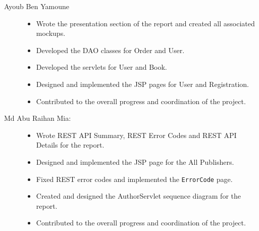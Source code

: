\begin{description}
	\item[Ayoub Ben Yamoune] 	    
	\begin{itemize}
		\item Wrote the presentation section of the report and created all associated mockups.
		\item Developed the DAO classes for Order and User.
		\item Developed the servlets for User and Book.
		\item Designed and implemented the JSP pages for User and Registration.
		\item Contributed to the overall progress and coordination of the project.
	\end{itemize}
	
	\item[Md Abu Raihan Mia:] \hfill
	\begin{itemize} 
	\item Wrote REST API Summary, REST Error Codes and REST API Details for the report.
	\item Designed and implemented the JSP page for the All Publishers.
	\item Fixed REST error codes and implemented the \texttt{ErrorCode} page.
	\item Created and designed the AuthorServlet sequence diagram for the report.
	\item Contributed to the overall progress and coordination of the project.
	\end{itemize}


\end{description}
